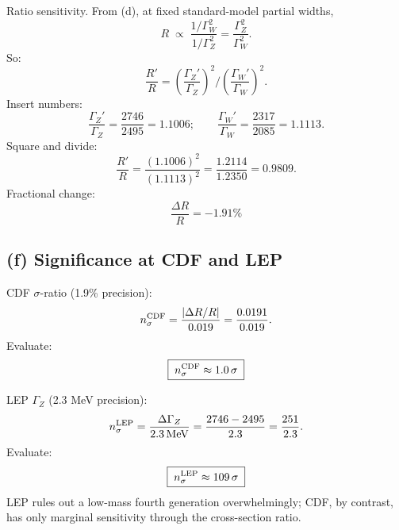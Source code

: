 \documentclass[11pt]{article}
\newcommand{\MeV}{\,\mathrm{MeV}}
\begin{document}
Ratio sensitivity. From (d), at fixed standard-model partial widths,
\[
R \;\propto\; \frac{1/\Gamma_W^2}{1/\Gamma_Z^2} = \frac{\Gamma_Z^2}{\Gamma_W^2}.
\]
So:
\[
\frac{R'}{R} = \left(\frac{\Gamma_Z'}{\Gamma_Z}\right)^2 \bigg/\left(\frac{\Gamma_W'}{\Gamma_W}\right)^2.
\]
Insert numbers:
\[
\frac{\Gamma_Z'}{\Gamma_Z} = \frac{2746}{2495} = 1.1006;\qquad \frac{\Gamma_W'}{\Gamma_W} = \frac{2317}{2085} = 1.1113.
\]
Square and divide:
\[
\frac{R'}{R} = \frac{(1.1006)^2}{(1.1113)^2} = \frac{1.2114}{1.2350} = 0.9809.
\]
Fractional change:
\[
\boxed{\;\frac{\Delta R}{R} = -1.91\%\;}
\]

\subsection*{(f) Significance at CDF and LEP}

CDF $\sigma$-ratio (1.9\% precision):
\[
n_\sigma^{\rm CDF} = \frac{|\Delta R/R|}{0.019} = \frac{0.0191}{0.019}.
\]
Evaluate:
\[
\boxed{\;n_\sigma^{\rm CDF} \approx 1.0\,\sigma\;}
\]

LEP $\Gamma_Z$ (2.3 MeV precision):
\[
n_\sigma^{\rm LEP} = \frac{\Delta\Gamma_Z}{2.3\MeV} = \frac{2746-2495}{2.3} = \frac{251}{2.3}.
\]
Evaluate:
\[
\boxed{\;n_\sigma^{\rm LEP} \approx 109\,\sigma\;}
\]
LEP rules out a low-mass fourth generation overwhelmingly; CDF, by contrast, has only marginal sensitivity through the cross-section ratio.
\end{document}
